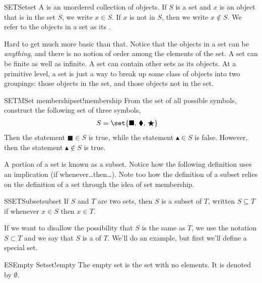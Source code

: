 %
\begin{definition}{SET}{Set}{set}
A  is an unordered collection of objects.  If $S$ is a set and $x$ is an object that is in the set $S$, we write $x\in S$.  If $x$ is not in $S$, then we write $x\not\in S$.  We refer to the objects in a set as its .
\end{definition}
%
Hard to get much more basic than that.   Notice that the objects in a set can be {\em anything}, and there is no notion of order among the elements of the set.  A set can be finite as well as infinite.  A set can contain other sets as its objects.  At a primitive level, a set is just a way to break up some class of objects into two groupings:  those objects in the set, and those objects not in the set.
%
\begin{example}{SETM}{Set membership}{set!membership}
From the set of all possible symbols, construct the following set of three symbols,
%
\begin{align*}
S&=\set{\blacksquare,\,\blacklozenge,\,\bigstar}
\end{align*}
%
Then the statement $\blacksquare\in S$ is true, while the statement $\blacktriangle\in S$ is false.  However, then the statement $\blacktriangle\not\in S$ is true.
\end{example}
%
A portion of a set is known as a subset.  Notice how the following definition uses an implication (if whenever\dots then\dots).  Note too how the definition of a subset relies on the definition of a set through the idea of set membership.
%
\begin{definition}{SSET}{Subset}{subset}
If $S$ and $T$ are two sets, then $S$ is a subset of $T$, written $S\subseteq T$ if whenever $x\in S$ then $x\in T$.
\end{definition}
%
If we want to disallow the possibility that $S$ is the same as $T$, we use the notation $S\subset T$ and we say that $S$ is a  of $T$.   We'll do an example, but first we'll define a special set.
%
%
\begin{definition}{ES}{Empty Set}{set!empty}
The empty set is the set with no elements.  It is denoted by $\emptyset$.
\end{definition}
